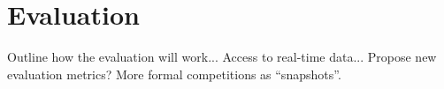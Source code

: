 \section{Evaluation}
\label{sec:evaluation}

Outline how the evaluation will work... Access to real-time data... Propose
new evaluation metrics?  More formal competitions as ``snapshots''.


